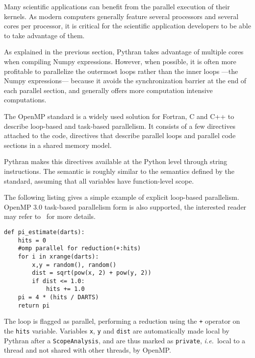 \documentclass[10pt, onecolumn, preprint]{sigplanconf}
\providecommand{\ie}[1][~]{\textit{i.e.}#1}
\begin{document}
Many scientific applications can benefit from the parallel execution of their
kernels. As modern computers generally feature several processors and several
cores per processor, it is critical for the scientific application developers to
be able to take advantage of them.

As explained in the previous section, Pythran takes advantage of multiple cores
when compiling Numpy expressions. However, when possible, it is often more
profitable to parallelize the outermost loops rather than the inner loops
---the Numpy expressions--- because it avoids the synchronization barrier at
the end of each parallel section, and generally offers more computation
intensive computations.

The OpenMP standard\cite{openmp3.1} is a widely used solution for Fortran, C
and C++ to describe loop-based and task-based parallelism. It consists of a few
directives attached to the code, directives that describe parallel loops and parallel code
sections in a shared memory model.

Pythran makes this directives available at the Python level through string
instructions. The semantic is roughly similar to the semantics defined by the
standard, assuming that all variables have function-level scope.

The following listing gives a simple example of explicit loop-based 
parallelism. OpenMP 3.0 task-based parallelism form is also supported, the
interested reader may refer to~\cite{pyhpc2013} for more details.

\begin{lstlisting}
def pi_estimate(darts):
    hits = 0
    #omp parallel for reduction(+:hits)
    for i in xrange(darts):
        x,y = random(), random()
        dist = sqrt(pow(x, 2) + pow(y, 2))
        if dist <= 1.0:
            hits += 1.0
    pi = 4 * (hits / DARTS)
    return pi
\end{lstlisting}

The loop is flagged as parallel, performing a reduction using the \texttt{+}
operator on the \texttt{hits} variable. Variables \texttt{x}, \texttt{y} and
\texttt{dist} are automatically made local by Pythran after a
\texttt{ScopeAnalysis}, and are thus marked as \texttt{private}, \ie{local to
a thread and not shared with other threads, by OpenMP}.

\end{document}
